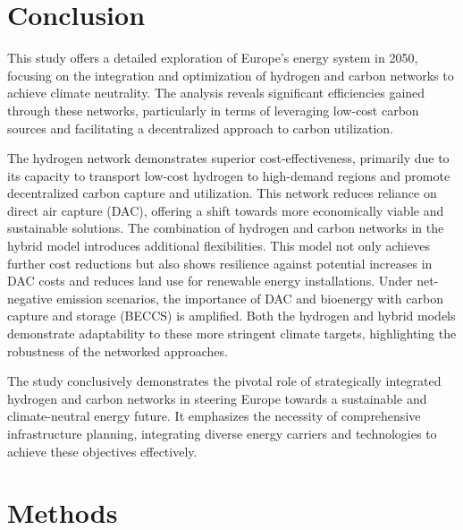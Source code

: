 \documentclass[twocolumn]{article}
\begin{document}
\section{Conclusion}
\label{sec:conclusion}

This study offers a detailed exploration of Europe's energy system in 2050, focusing on the integration and optimization of hydrogen and carbon networks to achieve climate neutrality. The analysis reveals significant efficiencies gained through these networks, particularly in terms of leveraging low-cost carbon sources and facilitating a decentralized approach to carbon utilization.

The hydrogen network demonstrates superior cost-effectiveness, primarily due to its capacity to transport low-cost hydrogen to high-demand regions and promote decentralized carbon capture and utilization. This network reduces reliance on direct air capture (DAC), offering a shift towards more economically viable and sustainable solutions.
The combination of hydrogen and carbon networks in the hybrid model introduces additional flexibilities. This model not only achieves further cost reductions but also shows resilience against potential increases in DAC costs and reduces land use for renewable energy installations.
Under net-negative emission scenarios, the importance of DAC and bioenergy with carbon capture and storage (BECCS) is amplified. Both the hydrogen and hybrid models demonstrate adaptability to these more stringent climate targets, highlighting the robustness of the networked approaches.


The study conclusively demonstrates the pivotal role of strategically integrated hydrogen and carbon networks in steering Europe towards a sustainable and climate-neutral energy future. It emphasizes the necessity of comprehensive infrastructure planning, integrating diverse energy carriers and technologies to achieve these objectives effectively.



\section*{Methods}
\label{sec:methodology}
\end{document}
